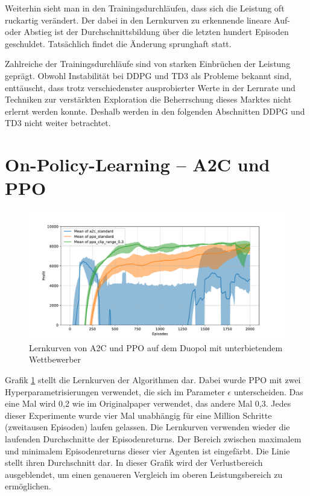 Weiterhin sieht man in den Trainingsdurchläufen, dass sich die Leistung oft ruckartig verändert.
Der dabei in den Lernkurven zu erkennende lineare Auf- oder Abstieg ist der Durchschnittsbildung über die letzten hundert Episoden geschuldet.
Tatsächlich findet die Änderung sprunghaft statt.

Zahlreiche der Trainingsdurchläufe sind von starken Einbrüchen der Leistung geprägt.
Obwohl Instabilität bei DDPG und TD3 als Probleme bekannt sind, enttäuscht, dass trotz verschiedenster ausprobierter Werte in der Lernrate und Techniken zur verstärkten Exploration die Beherrschung dieses Marktes nicht erlernt werden konnte.
Deshalb werden in den folgenden Abschnitten DDPG und TD3 nicht weiter betrachtet.

\section{On-Policy-Learning -- A2C und PPO}
\label{section:main_ppo}
\begin{figure}[htb]
	\centering
	\includegraphics[width=\textwidth]{main/a2c_vs_ppo.pdf}
	\caption{Lernkurven von A2C und PPO auf dem Duopol mit unterbietendem Wettbewerber}
	\label{graphic:OnPolicyLearningCurves}
\end{figure}

Grafik \ref{graphic:OnPolicyLearningCurves} stellt die Lernkurven der Algorithmen dar.
Dabei wurde PPO mit zwei Hyperparametrisierungen verwendet, die sich im Parameter $\epsilon$ unterscheiden.
Das eine Mal wird 0,2 wie im Originalpaper verwendet, das andere Mal 0,3.
Jedes dieser Experimente wurde vier Mal unabhängig für eine Million Schritte (zweitausen Episoden) laufen gelassen.
Die Lernkurven verwenden wieder die laufenden Durchschnitte der Episodenreturns.
Der Bereich zwischen maximalem und minimalem Episodenreturns dieser vier Agenten ist eingefärbt.
Die Linie stellt ihren Durchschnitt dar.
In dieser Grafik wird der Verlustbereich ausgeblendet, um einen genaueren Vergleich im oberen Leistungsbereich zu ermöglichen.

